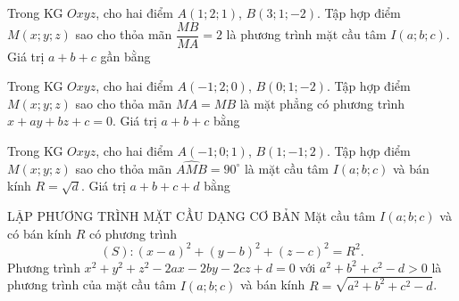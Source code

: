 \begin{ex}%
	Trong KG $Oxyz$, cho hai điểm $A(1;2;1)$, $B(3;1;-2)$. Tập hợp điểm $M(x;y;z)$ sao cho thỏa mãn $\dfrac{MB}{MA}=2$ là phương trình mặt cầu tâm $I(a;b;c)$. Giá trị $a+b+c$ gần bằng
\end{ex}
\begin{ex}%
	Trong KG $Oxyz$, cho hai điểm $A(-1;2;0)$, $B(0;1;-2)$. Tập hợp điểm $M(x;y;z)$ sao cho thỏa mãn $MA=MB$ là mặt phẳng có phương trình $x+ay+bz+c=0$. Giá trị $a+b+c$ bằng
\end{ex}
\begin{ex}%
	Trong KG $Oxyz$, cho hai điểm $A(-1;0;1)$, $B(1;-1;2)$. Tập hợp điểm $M(x;y;z)$ sao cho thỏa mãn $\widehat{AMB}=90^\circ$ là mặt cầu tâm $I(a;b;c)$ và bán kính $R=\sqrt{d}$. Giá trị $a+b+c+d$ bằng
\end{ex}
\begin{dang}{LẬP PHƯƠNG TRÌNH MẶT CẦU DẠNG CƠ BẢN}
Mặt cầu tâm $I(a;b;c)$ và có bán kính $R$ có phương trình $$(S)\colon{(x-a)^2}+(y-b)^2+(z-c)^2=R^2.$$	
Phương trình $x^2+y^2+z^2-2ax-2by-2cz+d=0$ với $a^2+b^2+c^2-d>0$ là phương trình của mặt cầu tâm $I(a;b;c)$ và bán kính $R=\sqrt{a^2+b^2+c^2-d}$.	
\end{dang}
